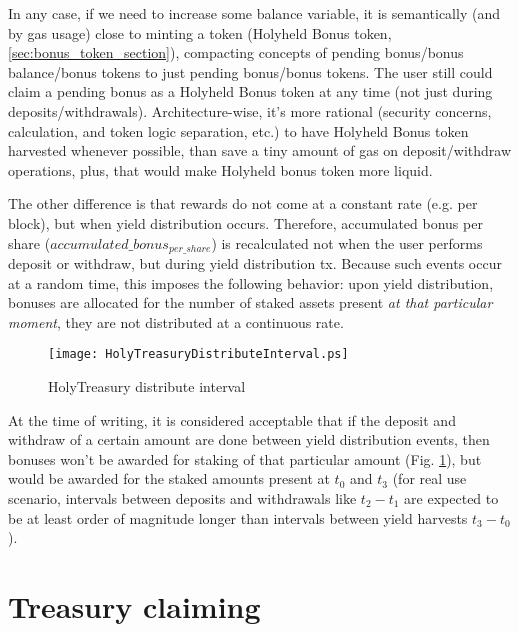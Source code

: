 \documentclass[12pt]{article}
\begin{document}
In any case, if we need to increase some balance variable, it is semantically (and by gas usage) close to minting a token (Holyheld Bonus token, \ref{sec:bonus_token_section}), compacting concepts of pending bonus/bonus balance/bonus tokens to just pending bonus/bonus tokens. The user still could claim a pending bonus as a Holyheld Bonus token at any time (not just during deposits/withdrawals). Architecture-wise, it's more rational (security concerns, calculation, and token logic separation, etc.) to have Holyheld Bonus token harvested whenever possible, than save a tiny amount of gas on deposit/withdraw operations, plus, that would make Holyheld bonus token more liquid.

\bigskip

The other difference is that rewards do not come at a constant rate (e.g. per block), but when yield distribution occurs.
Therefore, accumulated bonus per share ($accumulated\_bonus_{\mathit{per\_share}}$) is recalculated not when the user performs deposit or withdraw, but during yield distribution tx. Because such events occur at a random time, this imposes the following behavior: upon yield distribution, bonuses are allocated for the number of staked assets present \emph{at that particular moment}, they are not distributed at a continuous rate.

\begin{figure}[h]
  \begin{center}
    \centering
    \texttt{[image: HolyTreasuryDistributeInterval.ps]}
    \caption[Figure 2]{HolyTreasury distribute interval\label{fig:ht_yield_interval}}
  \end{center}
\end{figure}

At the time of writing, it is considered acceptable that if the deposit and withdraw of a certain amount are done between yield distribution events, then bonuses won't be awarded for staking of that particular amount (Fig.  \ref{fig:ht_yield_interval}), but would be awarded for the staked amounts present at $t_{0}$ and $t_{3}$ (for real use scenario, intervals between deposits and withdrawals like $t_{2} - t_{1}$ are expected to be at least order of magnitude longer than intervals between yield harvests $t_{3} - t_{0}$).







\section{Treasury claiming}
\end{document}

